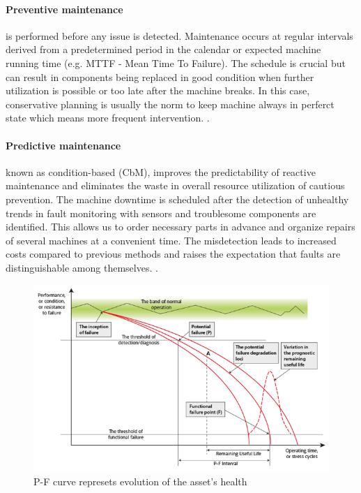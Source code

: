 \paragraph{Preventive maintenance} is performed before any issue is detected. Maintenance occurs at regular intervals derived from a predetermined period in the calendar or expected machine running time (e.g. MTTF - Mean Time To Failure). The schedule is crucial but can result in components being replaced in good condition when further utilization is possible or too late after the machine breaks. In this case, conservative planning is usually the norm to keep machine always in perferct state which means more frequent intervention. \cite{mohanty_machinery_2015}.  

\paragraph{Predictive maintenance} known as condition-based (CbM), improves the predictability of reactive maintenance and eliminates the waste in overall resource utilization of cautious prevention. The machine downtime is scheduled after the detection of unhealthy trends in fault monitoring with sensors and troublesome components are identified. This allows us to order necessary parts in advance and organize repairs of several machines at a convenient time. The misdetection leads to increased costs compared to previous methods and raises the expectation that faults are distinguishable among themselves. \cite{davies_handbook_2012}. \\

\begin{figure}[h]
	\centering
	\includegraphics[width=\textwidth]{assets/P-F-Curve.png}
	\caption{P-F curve represets evolution of the asset's health \cite{jennions_integrated_2011}}
	\label{fig:p-f-curve}
\end{figure}

